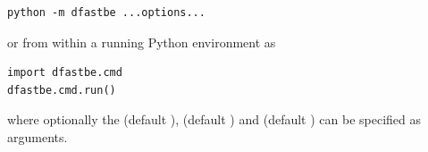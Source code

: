 \begin{Verbatim}
python -m dfastbe ...options...
\end{Verbatim}

or from within a running Python environment as

\begin{Verbatim}
import dfastbe.cmd
dfastbe.cmd.run()
\end{Verbatim}

where optionally the  (default ),  (default ) and  (default ) can be specified as arguments.